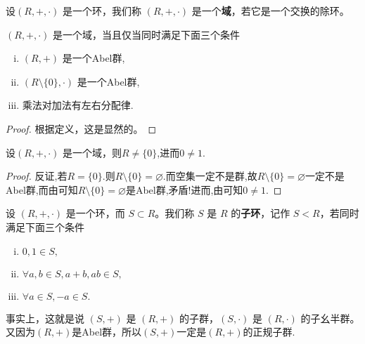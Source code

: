 \documentclass[../../main.tex]{subfiles}
\begin{document}
\begin{definition}[域]
设$(R, +, \cdot)$ 是一个环，我们称 $(R, +, \cdot)$ 是一个\textbf{域}，若它是一个交换的除环。
\end{definition}

\begin{proposition}[域的充要条件]\label{proposition:域的充要条件}
$(R, +, \cdot)$ 是一个域，当且仅当同时满足下面三个条件
\begin{enumerate}[(i)]
\item $(R, +)$  是一个Abel群,

\item $(R\setminus\{0\}, \cdot)$ 是一个Abel群,

\item 乘法对加法有左右分配律.
\end{enumerate}
\end{proposition}
\begin{proof}
根据定义，这是显然的。

\end{proof}

\begin{proposition}\label{proposition:域中加法单位元和乘法单位元一定不相等即0不等于1}
设$(R, +, \cdot)$ 是一个域，则$R\ne \{0\}$,进而$0\ne 1$.
\end{proposition}
\begin{proof}
反证,若$R=\{0\}$.则$R\setminus \{0\}=\varnothing.$而空集一定不是群,故$R\setminus \{0\}=\varnothing$一定不是Abel群,而由可知$R\setminus \{0\}=\varnothing$是Abel群,矛盾!进而,由可知$0\ne 1.$

\end{proof}

\begin{definition}[子环]
设 $(R, +, \cdot)$ 是一个环，而 $S \subset R$。我们称 $S$ 是 $R$ 的\textbf{子环}，记作 $S < R$，若同时满足下面三个条件
\begin{enumerate}[(i)]
\item $0, 1 \in S,$

\item $\forall a, b \in S, a + b, ab \in S,$

\item $\forall a \in S, -a \in S.$
\end{enumerate}
\end{definition}
\begin{note}
事实上，这就是说 $(S, +)$ 是 $(R, +)$ 的子群，$(S, \cdot)$ 是 $(R, \cdot)$ 的子幺半群。 又因为$(R,+)$是Abel群，所以$(S,+)$一定是$(R,+)$的正规子群.
\end{note}
\end{document}
